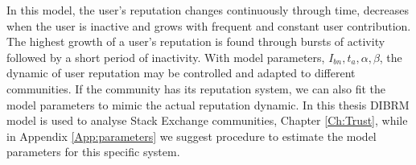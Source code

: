 In this model, the user's reputation changes continuously through time, decreases when the user is inactive and grows with frequent and constant user contribution. The highest growth of a user's reputation is found through bursts of activity followed by a short period of inactivity. With model parameters, $I_{bn}, t_a, \alpha, \beta$, the dynamic of user reputation may be controlled and adapted to different communities. If the community has its reputation system, we can also fit the model parameters to mimic the actual reputation dynamic. In this thesis DIBRM model is used to analyse Stack Exchange communities, Chapter \ref{Ch:Trust}, while in Appendix \ref{App:parameters} we suggest procedure to estimate the model parameters for this specific system.















